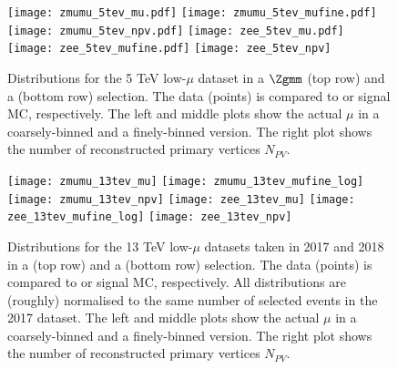 	\begin{figure}[tph]
		\centering
		\texttt{[image: zmumu\_5tev\_mu.pdf]}%
		\texttt{[image: zmumu\_5tev\_mufine.pdf]}%
		\texttt{[image: zmumu\_5tev\_npv.pdf]}
		\texttt{[image: zee\_5tev\_mu.pdf]}%
		\texttt{[image: zee\_5tev\_mufine.pdf]}%
		\texttt{[image: zee\_5tev\_npv]}
		\caption{Distributions for the 5 TeV low-$\mu$ dataset in a $\Zgmm$
			(top row) and a \Zgee (bottom row) selection. The data (points) is
			compared to \Zgmm or \Zgee signal MC, respectively. The left and
			middle plots show the actual $\mu$ in a coarsely-binned and a
			finely-binned version. The right plot shows the number of
			reconstructed primary vertices $N_{PV}$.}
		\label{fig:mu5}
	\end{figure}
	
	\begin{figure}[tph]
		\centering
		\texttt{[image: zmumu\_13tev\_mu]}%
		\texttt{[image: zmumu\_13tev\_mufine\_log]}%
		\texttt{[image: zmumu\_13tev\_npv]}
		\texttt{[image: zee\_13tev\_mu]}%
		\texttt{[image: zee\_13tev\_mufine\_log]}%
		\texttt{[image: zee\_13tev\_npv]}
		\caption{Distributions for the 13 TeV low-$\mu$ datasets taken in
			2017 and 2018 in a \Zgmm (top row) and a \Zgee (bottom row)
			selection. The data (points) is compared to \Zgmm or \Zgee signal
			MC, respectively. All distributions are (roughly) normalised to
			the same number of selected events in the 2017 dataset. The left
			and middle plots show the actual $\mu$ in a coarsely-binned and a
			finely-binned version. The right plot shows the number of
			reconstructed primary vertices $N_{PV}$.}
		\label{fig:mu13}
	\end{figure}
	
